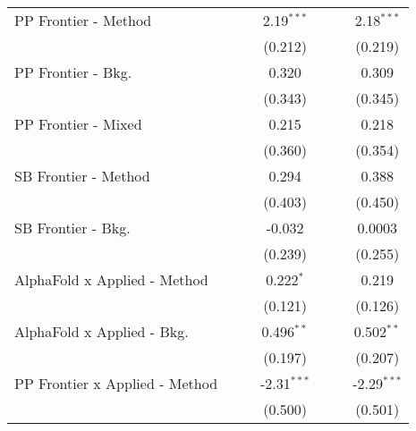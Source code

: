\begin{tabular}{lcccccc}
   PP Frontier - Method           &                &              & 2.19$^{***}$  &                &              & 2.18$^{***}$\\   
                                  &                &              & (0.212)       &                &              & (0.219)\\   
   PP Frontier - Bkg.             &                &              & 0.320         &                &              & 0.309\\   
                                  &                &              & (0.343)       &                &              & (0.345)\\   
   PP Frontier - Mixed            &                &              & 0.215         &                &              & 0.218\\   
                                  &                &              & (0.360)       &                &              & (0.354)\\   
   SB Frontier - Method           &                &              & 0.294         &                &              & 0.388\\   
                                  &                &              & (0.403)       &                &              & (0.450)\\   
   SB Frontier - Bkg.             &                &              & -0.032        &                &              & 0.0003\\   
                                  &                &              & (0.239)       &                &              & (0.255)\\   
   AlphaFold x Applied - Method   &                &              & 0.222$^{*}$   &                &              & 0.219\\   
                                  &                &              & (0.121)       &                &              & (0.126)\\   
   AlphaFold x Applied - Bkg.     &                &              & 0.496$^{**}$  &                &              & 0.502$^{**}$\\   
                                  &                &              & (0.197)       &                &              & (0.207)\\   
   PP Frontier x Applied - Method &                &              & -2.31$^{***}$ &                &              & -2.29$^{***}$\\   
                                  &                &              & (0.500)       &                &              & (0.501)\\   

\end{tabular}
